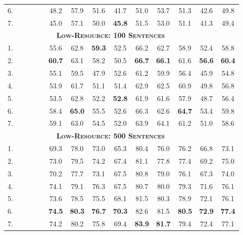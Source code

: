 \documentclass[11pt,a4paper]{article}
\newcommand{\cmark}{\textcolor{blue}{\ding{51}}}
\newcommand{\xmark}{\textcolor{red}{\ding{55}}}
\begin{document}
\begin{table*}[t]
\begin{tabular}{l|cccc||cccccccc|c}
6. & \cmark & \cmark & \cmark & \xmark & 48.2 & 57.9 & 51.6 & 41.7 & 51.0 & 53.7 & 51.3 & 42.6 & 49.8 \\
7. & \cmark & \cmark & \cmark & \cmark & 45.0 & 57.1 & 50.0 & \textbf{45.8} & 51.5 & 53.0 & 51.1 & 41.3 & 49.4 \\
\hline\hline
\multicolumn{13}{c}{\bf \textsc{Low-Resource: 100 Sentences}}\\
\hline
1. & \xmark & \cmark & \xmark & \xmark & 55.6 & 62.8 & \textbf{59.3} & 52.5 & 66.2 & 62.7 & 58.9 & 52.4 & 58.8 \\
2. & \xmark & \cmark & \cmark & \xmark & \textbf{60.7} & 63.1 & 58.2 & 50.5 & \textbf{66.7} & \textbf{66.1} & 61.6 & \textbf{56.6} & \textbf{60.4} \\
3. & \cmark & \xmark & \xmark & \xmark & 55.1 & 59.5 & 47.9 & 52.6 & 61.2 & 59.9 & 56.4 & 45.9 & 54.8 \\
4. & \cmark & \xmark & \cmark & \xmark & 53.9 & 61.7 & 51.1 & 51.4 & 62.9 & 62.5 & 60.9 & 49.8 & 56.8 \\
5. & \cmark & \xmark & \cmark & \cmark & 53.5 & 62.8 & 52.2 & \textbf{52.8} & 61.9 & 61.6 & 57.9 & 48.7 & 56.4 \\
6. & \cmark & \cmark & \cmark & \xmark & 58.4 & \textbf{65.0} & 55.5 & 52.6 & 66.3 & 62.6 & \textbf{64.7} & 53.4 & 59.8 \\
7. & \cmark & \cmark & \cmark & \cmark & 59.1 & 63.0 & 54.5 & 52.0 & 63.9 & 64.1 & 61.2 & 51.0 & 58.6 \\
\hline\hline
\multicolumn{13}{c}{\bf \textsc{Low-Resource: 500 Sentences}}\\
\hline
1. & \xmark & \cmark & \xmark & \xmark & 69.3 & 78.0 & 73.0 & 65.3 & 80.4 & 76.0 & 76.2 & 66.8 & 73.1 \\
2. & \xmark & \cmark & \cmark & \xmark & 73.0 & 79.5 & 74.2 & 67.4 & 81.1 & 77.8 & 77.4 & 69.2 & 75.0 \\
3. & \cmark & \xmark & \xmark & \xmark & 70.2 & 77.7 & 73.1 & 67.5 & 80.8 & 79.0 & 76.1 & 67.3 & 74.0 \\
4. & \cmark & \xmark & \cmark & \xmark & 74.1 & 79.1 & 76.3 & 67.5 & 80.7 & 80.0 & 79.3 & 71.6 & 76.1 \\
5. & \cmark & \xmark & \cmark & \cmark & 73.6 & 78.5 & 75.5 & 68.1 & 81.5 & 80.3 & 78.9 & 72.1 & 76.1 \\
6. & \cmark & \cmark & \cmark & \xmark & \textbf{74.5} & \textbf{80.3} & \textbf{76.7} & \textbf{70.3} & 82.6 & 81.5 & \textbf{80.5} & \textbf{72.9} & \textbf{77.4} \\
7. & \cmark & \cmark & \cmark & \cmark & 74.2 & 80.2 & 75.8 & 69.4 & \textbf{83.9} & \textbf{81.7} & 79.4 & 72.4 & 77.1 \\

\end{tabular}
\end{table*}
\end{document}
